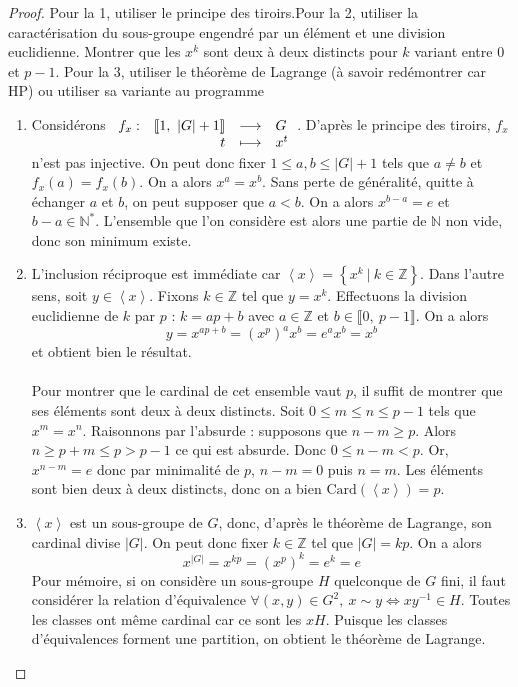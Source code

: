 \documentclass[french,a4paper]{article}
\newcommand{\N}{\mathbb{N}}
\newcommand{\Z}{\mathbb{Z}}
\newcommand{\st}{^*}
\newcommand{\inv}{^{-1}}
\newcommand{\card}{\text{Card}}
\theoremstyle{plain}
\theoremstyle{definition}
\theoremstyle{remark}
\begin{document}
\begin{proof}
	Pour la 1, utiliser le principe des tiroirs.Pour la 2, utiliser la caractérisation du sous-groupe engendré par un élément et une division euclidienne. Montrer que les $x^k$ sont deux à deux distincts pour $k$ variant entre 0 et $p-1$. Pour la 3, utiliser le théorème de Lagrange (à savoir redémontrer car HP) ou utiliser sa variante au programme
	\begin{enumerate}
		\item Considérons 
		$\begin{array}[t]{lrcl}
			f_x : & \llbracket1, \ |G|+1\rrbracket & \longrightarrow& G \\
			& t & \longmapsto &x^t
		\end{array} $. D'après le principe des tiroirs, $f_x$ n'est pas injective. On peut donc fixer $1 \leqslant a,b \leqslant |G|+1$ tels que $a\ne b$ et $f_x(a)=f_x(b)$. On a alors $x^a=x^b$. Sans perte de généralité, quitte à échanger $a$ et $b$, on peut supposer que $a<b$. On a alors $x^{b-a}=e$ et $b-a \in \N\st$. L'ensemble que l'on considère est alors une partie de $\N$ non vide, donc son minimum existe.
		\item L'inclusion réciproque est immédiate car $\left\langle x\right\rangle=\left\{x^k \ | \ k \in\Z\right\}$. Dans l'autre sens, soit $y\in \left\langle x\right\rangle$. Fixons $k\in\Z$ tel que $y=x^k$. Effectuons la division euclidienne de $k$ par $p$ : $k=ap +b$ avec $a\in\Z$ et $b\in\llbracket0, \ p-1\rrbracket$. On a alors $$y=x^{ap+b}=(x^p)^ax^b=e^ax^b=x^b$$ et obtient bien le résultat.
		\\ \\ Pour montrer que le cardinal de cet ensemble vaut $p$, il suffit de montrer que ses éléments sont deux à deux distincts.  Soit $0 \leqslant m \leqslant n \leqslant p-1$ tels que $x^m=x^n$. Raisonnons par l'absurde : supposons que $n-m \geqslant p$. Alors $n\geqslant p+m \leqslant p > p-1$ ce qui est absurde. Donc $0 \leqslant n-m <p$. Or, $x^{n-m}=e$ donc par minimalité de $p$, $n-m=0$ puis $n=m$. Les éléments sont bien deux à deux distincts, donc on a bien $\card(\left\langle x\right\rangle)=p$.
		\item $\left\langle x\right\rangle$ est un sous-groupe de $G$, donc, d'après le théorème de Lagrange, son cardinal divise $|G|$. On peut donc fixer $k\in\Z$ tel que $|G|=kp$. On a alors $$x^{|G|}=x^{kp}=(x^p)^k=e^k=e$$ Pour mémoire, si on considère un sous-groupe $H$ quelconque de $G$ fini, il faut considérer la relation d'équivalence $\forall(x,y)\in G^2, \ x\sim y \Longleftrightarrow xy\inv \in H$. Toutes les classes ont même cardinal car ce sont les $xH$. Puisque les classes d'équivalences forment une partition, on obtient le théorème de Lagrange.
	\end{enumerate}
\end{proof}
\end{document}
